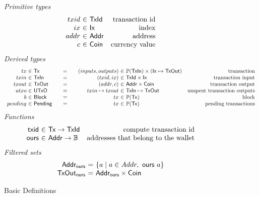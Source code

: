 \documentclass{article}
\newcommand{\powerset}[1]{\mathbb{P}(#1)}
\numberwithin{equation}{lemma}
\begin{document}
\begin{figure}

\emph{Primitive types}
%
\begin{equation*}
\begin{array}{r@{~\in~}lr}
  txid
& \mathsf{TxId}
& \text{transaction id}
\\
  ix
& \mathsf{Ix}
& \text{index}
\\
  addr
& \mathsf{Addr}
& \text{address}
\\
  c
& \mathsf{Coin}
& \text{currency value}
\end{array}
\end{equation*}
%
\emph{Derived types}
%
\begin{equation*}
\begin{array}{r@{~\in~}l@{\qquad=\qquad}r@{~\in~}lr}
  tx
& \mathsf{Tx}
& (inputs, outputs)
& \powerset{\mathsf{TxIn}} \times (\mathsf{Ix} \mapsto \mathsf{TxOut})
& \text{transaction}
\\
  txin
& \mathsf{TxIn}
& (txid, ix)
& \mathsf{TxId} \times \mathsf{Ix}
& \text{transaction input}
\\
  txout
& \mathsf{TxOut}
& (addr, c)
& \mathsf{Addr} \times \mathsf{Coin}
& \text{transaction output}
\\
  utxo
& \mathsf{UTxO}
& txin \mapsto txout
& \mathsf{TxIn} \mapsto \mathsf{TxOut}
& \text{unspent transaction outputs}
\\
  b
& \mathsf{Block}
& tx
& \powerset{\mathsf{Tx}}
& \text{block}
\\
  pending
& \mathsf{Pending}
& tx
& \powerset{\mathsf{Tx}}
& \text{pending transactions}
\end{array}
\end{equation*}
%
\emph{Functions}
%
\begin{equation*}
\begin{array}{r@{~\in~}lr}
  \mathsf{txid}
& \mathsf{Tx} \to \mathsf{TxId}
& \text{compute transaction id}
\\
  \mathsf{ours}
& \mathsf{Addr} \to \mathbb{B}
& \text{addresses that belong to the wallet}
\end{array}
\end{equation*}
%
\emph{Filtered sets}
%
\begin{equation*}
\begin{array}{r@{~=~}lr}
  \mathsf{Addr_{ours}}
& \{ a \mid a \in Addr, ~ \mathsf{ours} ~ a \}
\\
  \mathsf{TxOut_{ours}}
& \mathsf{Addr_{ours}} \times \mathsf{Coin}
\end{array}
\end{equation*}

\caption{\label{fig:basic_definitions}Basic Definitions}
\end{figure}
\end{document}
